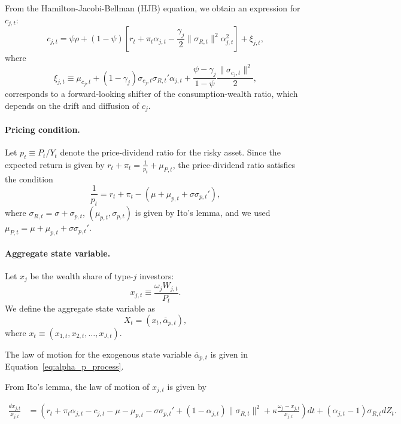 From the Hamilton-Jacobi-Bellman (HJB) equation, we obtain an expression for $c_{j,t}$:
\begin{equation}\label{eq:xi_j}
	c_{j,t} = \psi \rho + (1-\psi) \left[ r_t + \pi_t \alpha_{j,t} - \frac{\gamma_j}{2} \|\sigma_{R,t}\|^2 \alpha_{j,t}^2\right] + \xi_{j,t},
\end{equation}
where 
\begin{equation}\label{eq:shifter}
	\xi_{j,t} \equiv \mu_{c_j,t} + (1-\gamma_j)  \sigma_{c_j,t} \sigma_{R,t}' \alpha_{j,t} + \frac{\psi - \gamma_j}{1-\psi} \frac{\|\sigma_{c_j,t}\|^2}{2},
\end{equation} corresponds to a forward-looking shifter of the consumption-wealth ratio, which depends on the drift and diffusion of $c_j$.

\paragraph{Pricing condition.} Let $p_t \equiv P_t/Y_t$ denote the price-dividend ratio for the risky asset. Since the expected return is given by $r_t + \pi_t = \frac{1}{p_t} + \mu_{P,t}$, the price-dividend ratio satisfies the condition
\begin{equation}\label{eq:pricing_cond}
	\frac{1}{p_t} = r_t + \pi_t  -(\mu + \mu_{p,t} + \sigma \sigma_{p,t}'),
\end{equation}
where $\sigma_{R,t} = \sigma + \sigma_{p,t}$, $(\mu_{p,t}, \sigma_{p,t})$ is given by Ito's lemma, and we used $\mu_{P,t} =\mu + \mu_{p,t} + \sigma \sigma_{p,t}' $.

\paragraph{Aggregate state variable.} Let $x_j$ be the wealth share of type-$j$ investors:
\begin{equation}
	x_{j,t} \equiv \frac{\omega_j W_{j,t}}{P_t}.\nonumber
\end{equation}
We define the aggregate state variable as 
\begin{equation}\label{eq:agg-state-var}
	X_t = (x_t, \overline{\alpha}_{p,t}), 
\end{equation}
where $x_t \equiv \left(x_{1,t}, x_{2,t}, \ldots, x_{J,t}\right )$. 

The law of motion for the exogenous state variable $\overline{\alpha}_{p,t}$ is given in Equation~\eqref{eq:alpha_p_process}.


From Ito's lemma, the law of motion of $x_{j,t}$ is given by
\begin{small}
	\begin{align*}
		\frac{d x_{j,t}}{x_{j,t}} &= \left( r_t + \pi_t \alpha_{j,t} - c_{j,t} -\mu - \mu_{p,t} - \sigma \sigma_{p,t}'  +(1- \alpha_{j,t}) \|\sigma_{R,t}\|^2  +\kappa \frac{\omega_j-x_{j,t}}{x_{j,t}}  \right) dt + \left (\alpha_{j,t} - 1\right ) \sigma_{R,t} d Z_t.
	\end{align*}
\end{small}


